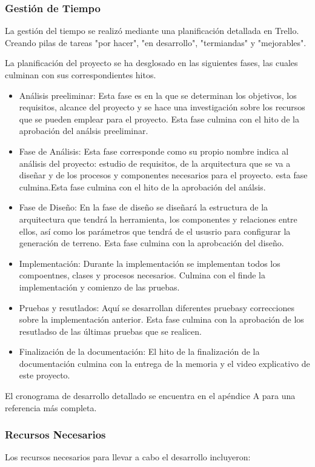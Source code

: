 \subsubsection{Gestión de Tiempo}
La gestión del tiempo se realizó mediante una planificación detallada en Trello. Creando pilas de tareas "por hacer", "en desarrollo", "termiandas" y "mejorables".

La planificación del proyecto se ha desglosado en las siguientes fases, las cuales culminan con sus correspondientes hitos.
\begin{itemize}
    \item Análisis preeliminar: Esta fase es en la que se determinan los objetivos, los requisitos, alcance del proyecto y se hace una investigación sobre los recursos que se pueden emplear para el proyecto. Esta fase culmina con el hito de la aprobación del análsis preeliminar.
    \item Fase de Análisis: Esta fase corresponde como su propio nombre indica al análisis del proyecto: estudio de requisitos, de la arquitectura que se va a diseñar y de los procesos y componentes necesarios para el proyecto. esta fase culmina.Esta fase culmina con el hito de la aprobación del análsis.
    \item Fase de Diseño: En la fase de diseño se diseñará la estructura de la arquitectura que tendrá la herramienta, los componentes y relaciones entre ellos, así como los parámetros que tendrá de el ususrio para configurar la generación de terreno. Esta fase culmina con la aprobcación del diseño.
    \item Implementación: Durante la implementación se implementan todos los compoentnes, clases y procesos necesarios. Culmina con el finde la implementación y comienzo de las pruebas.
    \item Pruebas y resutlados: Aquí se desarrollan diferentes pruebasy correcciones sobre la implementación anterior. Esta fase culmina con la aprobación de los resutladso de las últimas pruebas que se realicen.
    \item Finalización de la documentación: El hito de la finalización de la documentación culmina con la entrega de la memoria y el video explicativo de este proyecto.
\end{itemize}

El cronograma de desarrollo detallado se encuentra en el apéndice A para una referencia más completa.

\subsubsection{Recursos Necesarios}
Los recursos necesarios para llevar a cabo el desarrollo incluyeron:

